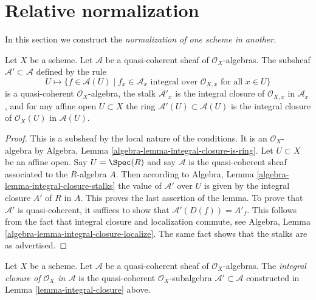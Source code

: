 \section{Relative normalization}
\label{section-normalization-X-in-Y}

\noindent
In this section we construct the {\it normalization of one scheme in another}.

\begin{lemma}
\label{lemma-integral-closure}
Let $X$ be a scheme. Let $\mathcal{A}$ be a quasi-coherent sheaf
of $\mathcal{O}_X$-algebras. The subsheaf $\mathcal{A}' \subset \mathcal{A}$
defined by the rule
$$
U \longmapsto \{f \in \mathcal{A}(U) \mid
f_x \in \mathcal{A}_x \text{ integral over } \mathcal{O}_{X, x}
\text{ for all }x \in U\}
$$
is a quasi-coherent $\mathcal{O}_X$-algebra, the stalk $\mathcal{A}'_x$
is the integral closure of $\mathcal{O}_{X, x}$ in $\mathcal{A}_x$, and
for any affine open $U \subset X$ the ring
$\mathcal{A}'(U) \subset \mathcal{A}(U)$ is
the integral closure of $\mathcal{O}_X(U)$ in $\mathcal{A}(U)$.
\end{lemma}

\begin{proof}
This is a subsheaf by the local nature of the conditions.
It is an $\mathcal{O}_X$-algebra by
Algebra, Lemma \ref{algebra-lemma-integral-closure-is-ring}.
Let $U \subset X$ be an affine open. Say $U = \Spec(R)$
and say $\mathcal{A}$ is the quasi-coherent sheaf associated to
the $R$-algebra $A$. Then according to
Algebra, Lemma \ref{algebra-lemma-integral-closure-stalks}
the value of $\mathcal{A}'$ over $U$ is given by the integral
closure $A'$ of $R$ in $A$. This proves the last assertion of
the lemma. To prove that $\mathcal{A}'$ is quasi-coherent, it
suffices to show that $\mathcal{A}'(D(f)) = A'_f$. This follows
from the fact that integral closure and localization commute, see
Algebra, Lemma \ref{algebra-lemma-integral-closure-localize}.
The same fact shows that the stalks are as advertised.
\end{proof}

\begin{definition}
\label{definition-integral-closure}
Let $X$ be a scheme. Let $\mathcal{A}$ be a quasi-coherent sheaf
of $\mathcal{O}_X$-algebras. The {\it integral closure of $\mathcal{O}_X$
in $\mathcal{A}$} is the quasi-coherent $\mathcal{O}_X$-subalgebra
$\mathcal{A}' \subset \mathcal{A}$ constructed in
Lemma \ref{lemma-integral-closure} above.
\end{definition}

